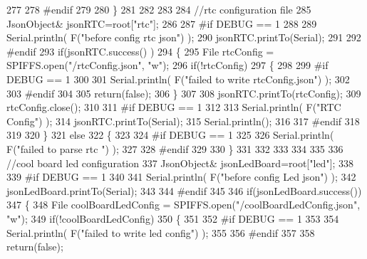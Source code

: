 \begin{DoxyCode}
277     
278 \textcolor{preprocessor}{    #endif}
279 
280     \}
281     
282     
283     
284     \textcolor{comment}{//rtc configuration file}
285         JsonObject& jsonRTC=root[\textcolor{stringliteral}{"rtc"}];
286 
287 \textcolor{preprocessor}{#if DEBUG == 1 }
288     
289     Serial.println( F(\textcolor{stringliteral}{"before config rtc json"}) );
290     jsonRTC.printTo(Serial);
291 
292 \textcolor{preprocessor}{#endif}
293     \textcolor{keywordflow}{if}(jsonRTC.success() )
294     \{
295         File rtcConfig = SPIFFS.open(\textcolor{stringliteral}{"/rtcConfig.json"}, \textcolor{stringliteral}{"w"});   
296         \textcolor{keywordflow}{if}(!rtcConfig)
297         \{
298         
299 \textcolor{preprocessor}{        #if DEBUG == 1 }
300 
301             Serial.println( F(\textcolor{stringliteral}{"failed to write rtcConfig.json"}) );
302 
303 \textcolor{preprocessor}{        #endif}
304 
305             \textcolor{keywordflow}{return}(\textcolor{keyword}{false});
306         \}
307 
308         jsonRTC.printTo(rtcConfig);
309         rtcConfig.close();
310 
311 \textcolor{preprocessor}{    #if DEBUG == 1 }
312 
313         Serial.println( F(\textcolor{stringliteral}{"RTC Config"}) );
314         jsonRTC.printTo(Serial);
315         Serial.println();
316     
317 \textcolor{preprocessor}{    #endif}
318 
319     
320     \}
321     \textcolor{keywordflow}{else}
322     \{
323     
324 \textcolor{preprocessor}{    #if DEBUG == 1 }
325 
326         Serial.println( F(\textcolor{stringliteral}{"failed to parse rtc "}) );
327     
328 \textcolor{preprocessor}{    #endif}
329 
330     \}
331 
332     
333     
334     
335     
336         \textcolor{comment}{//cool board led configuration}
337         JsonObject& jsonLedBoard=root[\textcolor{stringliteral}{"led"}];
338     
339 \textcolor{preprocessor}{#if DEBUG == 1 }
340 
341     Serial.println( F(\textcolor{stringliteral}{"before config Led json"}) );
342     jsonLedBoard.printTo(Serial);
343 
344 \textcolor{preprocessor}{#endif}
345 
346     \textcolor{keywordflow}{if}(jsonLedBoard.success())
347     \{   
348         File coolBoardLedConfig = SPIFFS.open(\textcolor{stringliteral}{"/coolBoardLedConfig.json"}, \textcolor{stringliteral}{"w"}); 
349         \textcolor{keywordflow}{if}(!coolBoardLedConfig)
350         \{
351         
352 \textcolor{preprocessor}{        #if DEBUG == 1 }
353         
354             Serial.println( F(\textcolor{stringliteral}{"failed to write led config"}) );
355         
356 \textcolor{preprocessor}{        #endif}
357 
358             \textcolor{keywordflow}{return}(\textcolor{keyword}{false});

\end{DoxyCode}
